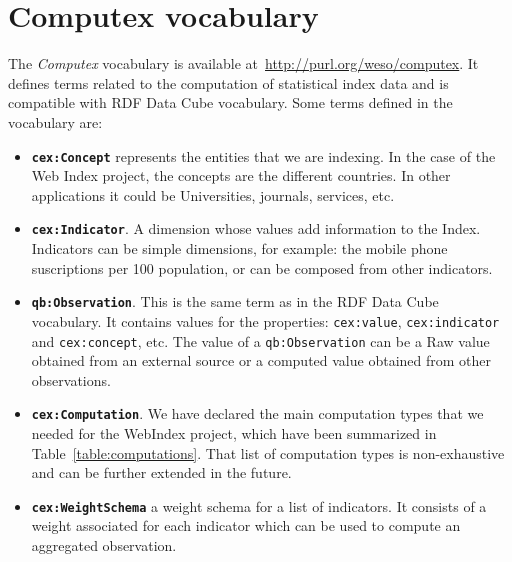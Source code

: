 \documentclass{acm_proc_article-sp}
\begin{document}
\section{Computex vocabulary}

The \emph{Computex} vocabulary is available
at~\url{http://purl.org/weso/computex}. It defines terms related to the
computation of statistical index data and is compatible with RDF Data Cube
vocabulary. Some terms defined in the vocabulary are:

\begin{itemize}
\item\textbf{\lstinline|cex:Concept|} represents the entities that we are
indexing.
In the case of the Web Index project, the concepts are the different countries.
In other applications it could be Universities, journals, services, etc.

\item\textbf{\lstinline|cex:Indicator|}. A dimension whose values add
information to the Index.
Indicators can be simple dimensions, for example: the mobile phone
suscriptions per 100 population, or can be composed from other
indicators. 

\item\textbf{\lstinline|qb:Observation|}. This is the same term as in the 
RDF Data Cube vocabulary. It contains values for the
properties: \lstinline|cex:value|, \lstinline|cex:indicator| 
and \lstinline|cex:concept|, etc. 
The value of a \lstinline|qb:Observation| can be a Raw value
   obtained from an external source or a computed value obtained from other
   observations.

\item\textbf{\lstinline|cex:Computation|}. We have declared the main computation
types that we needed for the WebIndex project, which have been summarized in
Table~\ref{table:computations}. That list of computation types is non-exhaustive
and can be further extended in the future. 

\item\textbf{\lstinline|cex:WeightSchema|} a weight schema for a list of
indicators. It consists of a weight associated for each indicator which can be
used to compute an aggregated observation.

\end{itemize}
\end{document}
